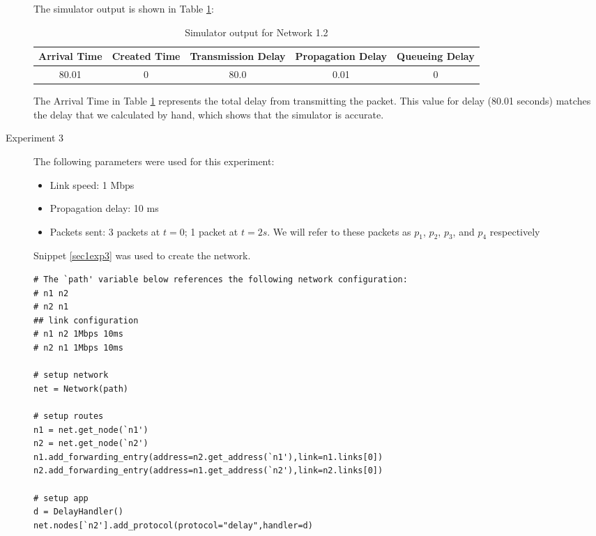 \documentclass[11pt]{article}
\begin{document}
\begin{description}
The simulator output is shown in Table \ref{tbl1.2}:

\smallskip

\begin{table}[H]
\begin{center}
\caption{Simulator output for Network 1.2}
\label{tbl1.2}
\begin{tabular}{ccccc}
  \toprule
  Arrival Time & Created Time & Transmission Delay & Propagation Delay & Queueing Delay\\
  \midrule
  80.01 & 0 & 80.0 & 0.01 & 0\\
  \bottomrule
\end{tabular}
\end{center}
\end{table}

\smallskip

The Arrival Time in Table \ref{tbl1.2} represents the total delay from transmitting the packet. This value for delay (80.01 seconds) matches the delay that we calculated by hand, which shows that the simulator is accurate.

\item[Experiment 3] \hfill \break
The following parameters were used for this experiment:

\begin{itemize}
\item Link speed: 1 Mbps
\item Propagation delay: 10 ms
\item Packets sent: 3 packets at $t = 0$; 1 packet at $t = 2s$. We will refer to these packets as $p_1$, $p_2$, $p_3$, and $p_4$ respectively
\end{itemize}

\medskip

Snippet \ref{sec1exp3} was used to create the network.

\medskip

\begin{lstlisting}[caption={Network 1.3},label=sec1exp3]
# The `path' variable below references the following network configuration:
# n1 n2
# n2 n1
## link configuration
# n1 n2 1Mbps 10ms
# n2 n1 1Mbps 10ms

# setup network
net = Network(path)

# setup routes
n1 = net.get_node(`n1')
n2 = net.get_node(`n2')
n1.add_forwarding_entry(address=n2.get_address(`n1'),link=n1.links[0])
n2.add_forwarding_entry(address=n1.get_address(`n2'),link=n2.links[0])

# setup app
d = DelayHandler()
net.nodes[`n2'].add_protocol(protocol="delay",handler=d)


\end{lstlisting}
\end{description}
\end{document}
